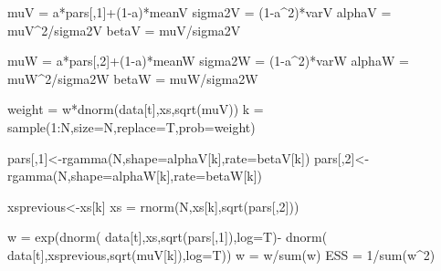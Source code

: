 \documentclass[
]{book}
\newenvironment{Shaded}{\begin{snugshade}}{\end{snugshade}}
\newcommand{\AttributeTok}[1]{\textcolor[rgb]{0.77,0.63,0.00}{#1}}
\newcommand{\DecValTok}[1]{\textcolor[rgb]{0.00,0.00,0.81}{#1}}
\newcommand{\FunctionTok}[1]{\textcolor[rgb]{0.00,0.00,0.00}{#1}}
\newcommand{\NormalTok}[1]{#1}
\newcommand{\OtherTok}[1]{\textcolor[rgb]{0.56,0.35,0.01}{#1}}
\newcommand{\SpecialCharTok}[1]{\textcolor[rgb]{0.00,0.00,0.00}{#1}}
\theoremstyle{break}
\theoremstyle{nonumberplain}
\begin{document}
\begin{Shaded}
\begin{Highlighting}[]
\NormalTok{    muV }\OtherTok{=}\NormalTok{ a}\SpecialCharTok{*}\NormalTok{pars[,}\DecValTok{1}\NormalTok{]}\SpecialCharTok{+}\NormalTok{(}\DecValTok{1}\SpecialCharTok{{-}}\NormalTok{a)}\SpecialCharTok{*}\NormalTok{meanV}
\NormalTok{    sigma2V }\OtherTok{=}\NormalTok{ (}\DecValTok{1}\SpecialCharTok{{-}}\NormalTok{a}\SpecialCharTok{\^{}}\DecValTok{2}\NormalTok{)}\SpecialCharTok{*}\NormalTok{varV}
\NormalTok{    alphaV }\OtherTok{=}\NormalTok{ muV}\SpecialCharTok{\^{}}\DecValTok{2}\SpecialCharTok{/}\NormalTok{sigma2V}
\NormalTok{    betaV }\OtherTok{=}\NormalTok{ muV}\SpecialCharTok{/}\NormalTok{sigma2V}
    
\NormalTok{    muW }\OtherTok{=}\NormalTok{ a}\SpecialCharTok{*}\NormalTok{pars[,}\DecValTok{2}\NormalTok{]}\SpecialCharTok{+}\NormalTok{(}\DecValTok{1}\SpecialCharTok{{-}}\NormalTok{a)}\SpecialCharTok{*}\NormalTok{meanW}
\NormalTok{    sigma2W }\OtherTok{=}\NormalTok{ (}\DecValTok{1}\SpecialCharTok{{-}}\NormalTok{a}\SpecialCharTok{\^{}}\DecValTok{2}\NormalTok{)}\SpecialCharTok{*}\NormalTok{varW}
\NormalTok{    alphaW }\OtherTok{=}\NormalTok{ muW}\SpecialCharTok{\^{}}\DecValTok{2}\SpecialCharTok{/}\NormalTok{sigma2W}
\NormalTok{    betaW }\OtherTok{=}\NormalTok{ muW}\SpecialCharTok{/}\NormalTok{sigma2W}
    
\NormalTok{    weight      }\OtherTok{=}\NormalTok{ w}\SpecialCharTok{*}\FunctionTok{dnorm}\NormalTok{(data[t],xs,}\FunctionTok{sqrt}\NormalTok{(muV))}
\NormalTok{    k           }\OtherTok{=} \FunctionTok{sample}\NormalTok{(}\DecValTok{1}\SpecialCharTok{:}\NormalTok{N,}\AttributeTok{size=}\NormalTok{N,}\AttributeTok{replace=}\NormalTok{T,}\AttributeTok{prob=}\NormalTok{weight)}
    
\NormalTok{    pars[,}\DecValTok{1}\NormalTok{]}\OtherTok{\textless{}{-}}\FunctionTok{rgamma}\NormalTok{(N,}\AttributeTok{shape=}\NormalTok{alphaV[k],}\AttributeTok{rate=}\NormalTok{betaV[k])}
\NormalTok{    pars[,}\DecValTok{2}\NormalTok{]}\OtherTok{\textless{}{-}}\FunctionTok{rgamma}\NormalTok{(N,}\AttributeTok{shape=}\NormalTok{alphaW[k],}\AttributeTok{rate=}\NormalTok{betaW[k])}
    
\NormalTok{    xsprevious}\OtherTok{\textless{}{-}}\NormalTok{xs[k]}
\NormalTok{    xs }\OtherTok{=} \FunctionTok{rnorm}\NormalTok{(N,xs[k],}\FunctionTok{sqrt}\NormalTok{(pars[,}\DecValTok{2}\NormalTok{]))}
    
\NormalTok{    w           }\OtherTok{=} \FunctionTok{exp}\NormalTok{(}\FunctionTok{dnorm}\NormalTok{( data[t],xs,}\FunctionTok{sqrt}\NormalTok{(pars[,}\DecValTok{1}\NormalTok{]),}\AttributeTok{log=}\NormalTok{T)}\SpecialCharTok{{-}}
                        \FunctionTok{dnorm}\NormalTok{( data[t],xsprevious,}\FunctionTok{sqrt}\NormalTok{(muV[k]),}\AttributeTok{log=}\NormalTok{T))}
\NormalTok{    w           }\OtherTok{=}\NormalTok{ w}\SpecialCharTok{/}\FunctionTok{sum}\NormalTok{(w)}
\NormalTok{    ESS         }\OtherTok{=} \DecValTok{1}\SpecialCharTok{/}\FunctionTok{sum}\NormalTok{(w}\SpecialCharTok{\^{}}\DecValTok{2}\NormalTok{)}
    

\end{Highlighting}
\end{Shaded}
\end{document}
